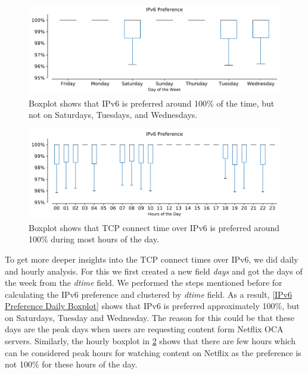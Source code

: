\begin{figure}[!ht]
	\centering
	\includegraphics[keepaspectratio, height=4cm, width=15cm]{figures/preference/he-preference-day-boxplot.pdf}
	\caption[IPv6 Preference Boxplot per Day of the Week]{Boxplot shows that IPv6 is preferred around 100\% of the time, but not on Saturdays, Tuesdays, and Wednesdays.}
	\label{fig:IPv6 Preference Daily Boxplot}
\end{figure}
\begin{figure}[!ht]
	\centering
	\includegraphics[keepaspectratio, height=4cm, width=15cm]{figures/preference/he-preference-hourly-boxplot.pdf}
	\caption[IPv6 Preference Boxplot per Hours of the Day]{Boxplot shows that TCP connect time over IPv6 is preferred around 100\% during most hours of the day.}
	\label{fig:IPv6 Preference Hourly}
\end{figure}

To get more deeper insights into the TCP connect times over IPv6, we did daily and hourly analysis. For this we first created a new field \textit{days} and got the days of the week from the \textit{dtime} field. 
We performed the steps mentioned before for calculating the IPv6 preference and clustered by \textit{dtime} field. As a result, \cref{IPv6 Preference Daily Boxplot} shows that 
IPv6 is preferred approximately 100\%, but on Saturdays, Tuesday and Wednesday. The reason for this could be that these days are the peak days when users are requesting content 
form Netflix OCA servers. Similarly, the hourly boxplot in \cref{fig:IPv6 Preference Hourly} shows that there are few hours which can be considered peak hours for watching content 
on Netflix as the preference is not 100\% for these hours of the day.

